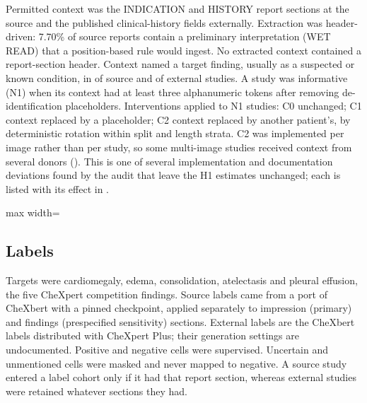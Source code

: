 Permitted context was the INDICATION and HISTORY report sections at the source
and the published clinical-history fields externally. Extraction was
header-driven: 7.70\% of source reports contain a preliminary interpretation
(WET READ) that a position-based rule would ingest. No extracted context
contained a report-section header. Context named a target finding, usually as a
suspected or known condition, in \ScanTargetSrc{} of source and
\ScanTargetExt{} of external studies. A study was informative (N1) when its
context had at least three alphanumeric tokens after removing
de-identification placeholders. Interventions applied to N1 studies: C0
unchanged; C1 context replaced by a placeholder; C2 context replaced by another
patient's, by deterministic rotation within split and length strata. C2 was
implemented per image rather than per study, so some multi-image studies
received context from several donors (). This is one of several
implementation and documentation deviations found by the audit that leave the
H1 estimates unchanged; each is listed with its effect in .

\begin{table}[H]
\centering\footnotesize
\caption{Cohort construction (source exclusions are sequential; tiers are
patient-disjoint).}
\label{tab:cohort}
\begin{adjustbox}{max width=\linewidth}

\end{adjustbox}
\end{table}

\subsection*{Labels}
Targets were cardiomegaly, edema, consolidation, atelectasis and pleural
effusion, the five CheXpert competition findings.\cite{irvin2019} Source labels came from a port of CheXbert\cite{smit2020} with a
pinned checkpoint, applied separately to impression (primary) and findings
(prespecified sensitivity) sections. External labels are the CheXbert labels
distributed with CheXpert Plus; their generation settings are undocumented.
Positive and negative cells were supervised. Uncertain and unmentioned cells
were masked and never mapped to negative. A source study entered a label
cohort only if it had that report section, whereas external studies were
retained whatever sections they had.

